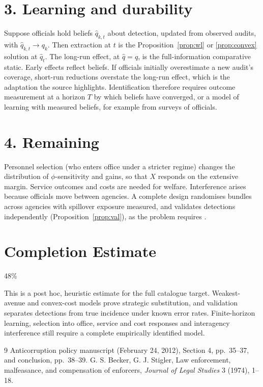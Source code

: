 \documentclass[11pt]{article}
\theoremstyle{definition}
\begin{document}
\section*{3. Learning and durability}
Suppose officials hold beliefs $\hat q_{k,t}$ about detection, updated from observed audits, with
$\hat q_{k,t}\to q_k$. Then extraction at $t$ is the Proposition~\ref{prop:wl} or \ref{prop:convex} solution at $\hat q_t$. The
long-run effect, at $\hat q=q$, is the full-information comparative static. Early effects reflect beliefs. If officials
initially overestimate a new audit's coverage, short-run reductions overstate the long-run effect, which is the adaptation
the source highlights. Identification therefore requires outcome measurement at a horizon $T$ by which beliefs have
converged, or a model of learning with measured beliefs, for example from surveys of officials.

\section*{4. Remaining}
Personnel selection (who enters office under a stricter regime) changes the distribution of $\phi$-sensitivity and gains,
so that $X$ responds on the extensive margin. Service outcomes and costs are needed for welfare. Interference arises because
officials move between agencies. A complete design randomises bundles across agencies with spillover exposure measured, and
validates detections independently (Proposition~\ref{prop:val}), as the problem requires \cite{ol}.

\section{Completion Estimate}
48\%

This is a post hoc, heuristic estimate for the full catalogue target.
Weakest-avenue and convex-cost models prove strategic substitution, and validation separates detections from true incidence under known error rates. Finite-horizon learning, selection into office, service and cost responses and interagency interference still require a complete empirically identified model.

\begin{thebibliography}{9}
 Anticorruption policy manuscript (February 24, 2012), Section 4, pp.~35--37, and conclusion, pp.~38--39.
 G. S. Becker, G. J. Stigler, Law enforcement, malfeasance, and compensation of enforcers, \emph{Journal of Legal Studies} 3 (1974), 1--18.
\end{thebibliography}
\end{document}
